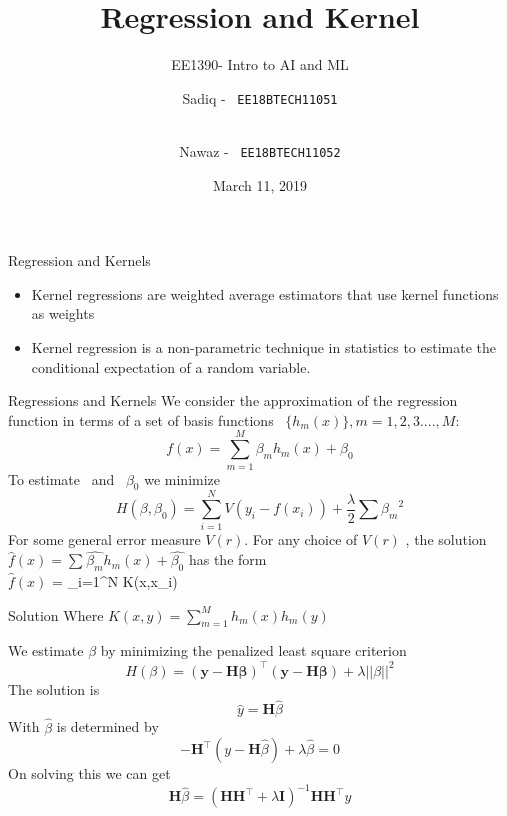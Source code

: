 \documentclass{beamer}
\title{Regression and Kernel}
\subtitle{EE1390- Intro to AI and ML}
\author{
 Sadiq -  \
\texttt{EE18BTECH11051}
\and \\
 Nawaz -  \
\texttt{EE18BTECH11052}
}
\institute{IIT HYDERABAD}
\date{March 11, 2019}
\begin{document}
\begin{frame}
  \titlepage
\end{frame}

\begin{frame}{Regression and Kernels}
\begin{itemize}
    \item Kernel regressions are weighted average estimators that use kernel functions as weights
    \item Kernel regression is a non-parametric technique in statistics to estimate the conditional expectation of a random variable.
    
\end{itemize}
  
\end{frame}

 
\begin{frame}{Regressions and Kernels}
  We consider the approximation of the regression function in terms of a set of basis functions \ $\{  h_{m}(x)  \}, m = 1,2,3....,M:$
  \begin{equation}
      f(x) = \sum_{m=1}^{M} \beta_{m} h_{m}(x) + \beta_{0}
  \end{equation}
 To estimate \beta \ and \  $\beta_{0}$  we   minimize
 \begin{equation}
     H(\beta,\beta_{0}) = \sum_{i=1}^{N} V(y_{i} - f(x_{i})) + \frac{\lambda}{2} \sum_{}^{} {\beta_{m}}^2
     \end{equation}
     For some general error measure $V(r)$. For any choice of $V(r)$ , the solution $\hat{f}(x) = \sum_{}^{} \hat{\beta_{m}}  h_{m}(x) + \hat{\beta_{0}}$ has the form
     \\  $\hat{f}(x)$ = \sum_{i=1}^{N}  K(x,x_{i})
\end{frame}

 

\begin{frame}{Solution}
Where $K(x,y) = \sum_{m =1}^{M} h_{m}(x) h_{m}(y)$

We estimate $\beta$ by minimizing the penalized least square criterion 
\begin{equation}
    H(\beta) =  (\mathbf{y - H\beta})^\intercal(\mathbf{y - H\beta}) + \lambda ||\beta||^2
\end{equation}
The solution is 
\begin{equation}
\hat{y} = \mathbf{H}\hat{\beta}
\end{equation}
With $\hat{\beta}$ is determined by
\begin{equation}
    -\mathbf{H}^\intercal(y-\mathbf{H}\hat{\beta}) + \lambda\hat{\beta} = 0
\end{equation}
On solving this we can get
\begin{equation}
    \mathbf{H}\hat{\beta} = {(\mathbf{H}\mathbf{H}^\intercal + \lambda\mathbf{I})}^{-1}\mathbf{HH}^\intercal y
\end{equation}
\end{frame}
\end{document}
